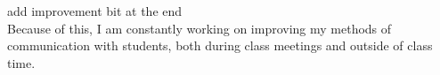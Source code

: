 \documentclass[12pt]{amsart} \usepackage{amssymb}
\begin{document}
\vspace{1cm}
add improvement bit at the end\\
Because of this, I am constantly working on improving my methods of communication with students, both during class meetings and outside of class time.


\end{document}
